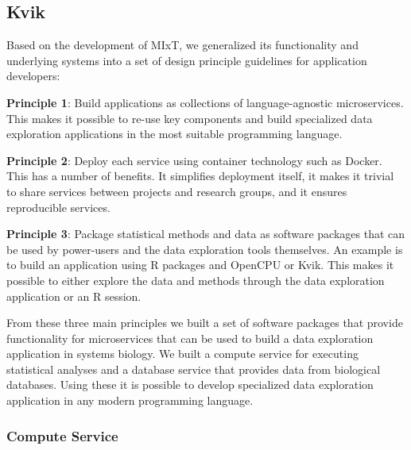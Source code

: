 \subsection*{Kvik}
Based on the development of MIxT, we generalized its functionality and
underlying systems into a set of design principle guidelines for application
developers: 

\textbf{Principle 1}: Build applications as collections of language-agnostic
microservices. This makes it possible to re-use key components and build
specialized data exploration applications in the most suitable programming
language. 

\textbf{Principle 2}: Deploy each service using container technology such as
Docker. This has a number of benefits. It simplifies deployment itself, it makes
it trivial to share services between projects and research groups, and it
ensures reproducible services.

\textbf{Principle 3}: Package statistical methods and data as software packages
that can be used by power-users and the data exploration tools themselves. An
example is to build an application using R packages and OpenCPU or Kvik. This
makes it possible to either explore the data and methods through the data
exploration application or an R session. 

From these three main principles we built a set of software packages that
provide functionality for microservices that can be used to build a data
exploration application in systems biology. We built a compute service for
executing statistical analyses and a database service that provides data from
biological databases. Using these it is possible to develop specialized data
exploration application in any modern programming language.  


\subsubsection*{Compute Service}

